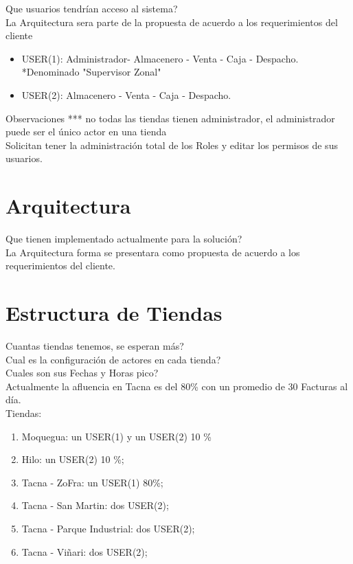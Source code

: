 \documentclass[pdftex,12pt,oneside,a4paper,spanish, english, brazil]{abntex2}
\begin{document}
\begin{sloppypar}
            Que usuarios tendrían acceso al sistema?\\
            La Arquitectura sera parte de la propuesta de acuerdo a los requerimientos del cliente
            
            \begin{itemize}
            	\item USER(1): Administrador- Almacenero - Venta - Caja - Despacho. *Denominado "Supervisor Zonal"
            	\item USER(2): Almacenero - Venta - Caja - Despacho.
            \end{itemize}
            
            	    Observaciones *** no todas las tiendas tienen administrador, el administrador puede ser el único actor en una tienda\\
            	Solicitan tener la administración total de los Roles y editar los permisos de sus usuarios.

            \section{Arquitectura}
            Que tienen implementado actualmente para la solución?\\
            La Arquitectura forma se presentara como propuesta de acuerdo a los requerimientos del cliente.
            \section{Estructura de Tiendas}
            Cuantas tiendas tenemos, se esperan más?\\
            Cual es la configuración de actores en cada tienda?\\
            Cuales son sus Fechas y Horas pico?\\
            	Actualmente la afluencia en Tacna es del 80\%  con un promedio de 30 Facturas al día.\\
            	Tiendas:\\
            \begin{enumerate}
            	\item Moquegua: un USER(1) y un USER(2) 10 \% 
            	\item Hilo: un USER(2) 10 \%;
            	\item Tacna - ZoFra:  un USER(1) 80\%;
            	\item Tacna - San Martin: dos USER(2);
            	\item Tacna - Parque Industrial: dos USER(2);
            	\item Tacna - Viñari: dos USER(2);
            \end{enumerate}
            

\end{sloppypar}
\end{document}
